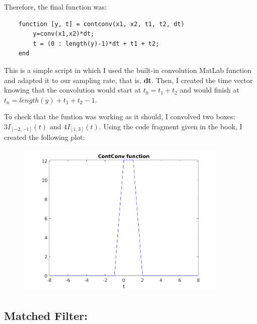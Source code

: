 \documentclass[a4paper,11pt]{article}
\begin{document}
\newpage

Therefore, the final function was:

\bigskip

\begin{lstlisting}
    function [y, t] = contconv(x1, x2, t1, t2, dt)
        y=conv(x1,x2)*dt;
        t = (0 : length(y)-1)*dt + t1 + t2;
    end
\end{lstlisting}

\bigskip

This is a simple script in which I used the built-in convolution MatLab function and adapted it to our sampling rate, that is, \textbf{dt}. Then, I created the time vector knowing that the convolution would start at $t_{0} = t_{1} + t_{2}$ and would finish at $t_{n} = length(y) + t_{1} + t_{2} -1$.

\bigskip

To check that the funtion was working as it should, I convolved two boxes: $3I_{[-2,-1]}(t)$ and $4I_{[1,3]}(t)$. Using the code fragment given in the book, I created the following plot:

\begin{figure}[!hp]
    \begin{center}
      \includegraphics[width=0.9\textwidth]{images/exercice_2.png}
    \end{center}
\end{figure}

\newpage

\subsection{Matched Filter:}
\end{document}
